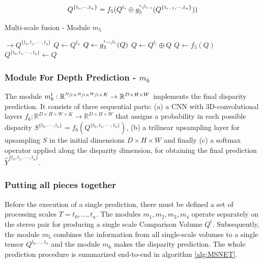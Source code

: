\documentclass[runningheads]{llncs}
\begin{document}
\begin{equation} \label{eq:two_scale_fusion}
Q^{ \{ t_i, \cdot \cdot \cdot, t_{n} \} } = f_5(Q^{t_i} \oplus g_5^{\sfrac{t_i}{t_{i-1}} }(Q^{ \{ t_{i-1}, \cdot \cdot \cdot, t_n \} }))
\end{equation}

\begin{algorithm}
\caption{Multi-scale fusion - Module $m_5$}\label{alg:multi_scale_fusion}
\begin{algorithmic}[1]
 $\rightarrow Q^{\{t_0, t_1, \cdot \cdot \cdot, t_n\}}$ 
\State $Q \gets Q^{t_n}$ 
\State $Q \gets g_3^{\sfrac{ t_{i+1} }{ t_i } }(Q)$ 
\State $Q \gets Q^{t_i} \oplus Q$ 
\State $Q \gets f_5(Q)$ 
\EndFor
\State \Return $Q^{\{t_0, t_1, \cdot \cdot \cdot, t_n\}} \gets Q$ 
\EndProcedure
\end{algorithmic}
\end{algorithm}


\subsubsection{Module For Depth Prediction - $m_6$}

The module $m_6^t: \mathbb{R}^{\sfrac{D}{t} \times \sfrac{H}{t} \times \sfrac{W}{t} \times K} \rightarrow \mathbb{R}^{D \times H \times W}$ implements the final disparity prediction. It consists of three sequential parts: (a) a CNN with 3D-convolutional layers $f_6: \mathbb{R}^{D \times H \times W \times K} \rightarrow \mathbb{R}^{D \times H \times W}$ that assigns a probability in each possible disparity $S^{\{ t_0, \cdot \cdot \cdot, t_n \}} = f_6(Q^{\{t_0, t_1, \cdot \cdot \cdot, t_n\}})$, (b) a trilinear upsampling layer for upsampling $S$ in the initial dimensions $D \times H \times W$ and finally (c) a softmax operator applied along the disparity dimension, for obtaining the final prediction $\hat{Y}^{\{t_0, t_1, \cdot \cdot \cdot, t_n\}}$.

\subsubsection{Putting all pieces together}

Before the execution of a single prediction, there must be defined a set of processing scales $T = {t_0, ..., t_n}$. The modules $m_1, m_2, m_3, m_4$ operate separately on the stereo pair for producing a single scale Comparison Volume $Q^t$. Subsequently, the module $m_5$ combines the information from all single-scale volumes to a single tensor $Q^{t_0, ..., t_n}$ and the module $m_6$ makes the disparity prediction. The whole prediction procedure is summarized end-to-end in algorithm \ref{alg:MSNET}.
\end{document}
